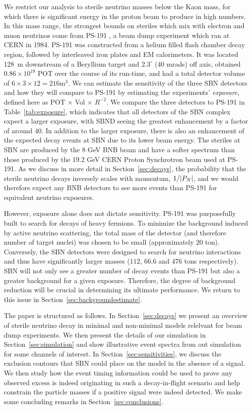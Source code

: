 \documentclass[11pt, a4paper]{article}
\newcommand{\refsec}[1]{Section~\ref{#1}}
\newcommand{\reftab}[1]{Table~\ref{#1}}
\def\ster{\ensuremath N}
\begin{document}
We restrict our analysis to sterile neutrino masses below the Kaon mass, for
which there is significant energy in the proton beam to produce in high numbers. In this mass range, the
strongest bounds on steriles which mix with electron and muon neutrinos come
from PS-191 \cite{Bernardi:1985ny, Bernardi:1987ek}, a beam dump experiment
which ran at CERN in 1984. 
%
PS-191 was constructed from a helium filled flash chamber decay region,
followed by interleaved iron plates and EM calorimeters. It was located 128~m
downstream of a Beryllium target and $2.3^\circ$ (40 mrads) off axis, obtained
$0.86 \times 10^{19}$ POT over the course of its run-time, and had a total
detector volume of $6\times3\times12 = 216 \text{m}^3$. We can estimate the
sensitivity of the three SBN detectors and how they will compare to PS-191 by
estimating the experiments' \emph{exposure}, defined here as POT $\times$ Vol
$\times$ $R^{-2}$. We compare the three detectors to PS-191 in
\reftab{tab:exposure}, which indicates that all detectors of the SBN complex
expect a larger exposure, with SBND seeing the greatest enhancement by a factor
of around $40$. 
%
In addition to the larger exposure, there is also an enhancement of the
expected decay events at SBN due to its lower beam energy. The steriles at SBN
are produced by the 8 GeV BNB beam and have a softer spectrum than those
produced by the 19.2 GeV CERN Proton Synchrotron beam used at PS-191. As we
discuss in more detail in \refsec{sec:decays}, the probability that the sterile
neutrino decays inversely scales with momentum, $1/|P_\ster|$, and we would
therefore expect any BNB detectors to see more events than PS-191 for
equivalent neutrino exposures.

However, exposure alone does not dictate sensitivity. PS-191 was purposefully
built to search for decays of heavy fermions. To minimize the background
induced by active neutrino scattering, the total mass of the detector (and
therefore number of target nuclei) was chosen to be small (approximately $20$
ton). Conversely, the SBN detectors were designed to search for neutrino
interactions and thus have significantly larger masses ($112$, $66.6$ and $476$
tons respectively). SBN will not only see a greater number of decay events than
PS-191 but also a greater background for a given exposure. Therefore, the
degree of background reduction will be crucial in determining its ultimate
performance. We return to this issue in \refsec{sec:backgroundestimate}.

The paper is structured as follows. In \refsec{sec:decays} we present an
overview of sterile neutrino decay in minimal and non-minimal models relelvant
for beam dump experiments. We then present the details of our simulation in
\refsec{sec:simulation} and show illustrative event spectra from out simulation
for some channels of interest. In \refsec{sec:sensitivities}, we discuss the
exclusion contours that SBN could place on the model in the absence of a
signal. We then study how the event timing information could be used to prove
any observed excess is indeed originating in such a decay-in-flight scenario
and help constrain the particle masses if a positive signal were indeed
detected. We make some concluding remarks in \refsec{sec:conclusions}.
\end{document}
